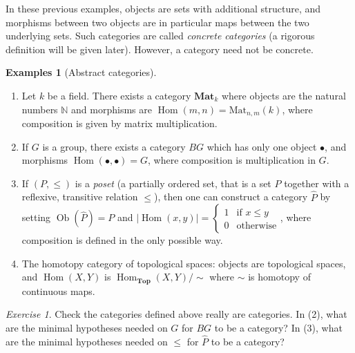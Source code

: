\documentclass{article}
\newcommand{\N}{\mathbb{N}}
\newcommand{\Top}{\mathbf{Top}}
\DeclareMathOperator{\Ob}{Ob}
\DeclareMathOperator{\Hom}{Hom}
\theoremstyle{plain}
\theoremstyle{definition}
\newtheorem{examples}[theorem]{Examples}
\theoremstyle{remark}
\newtheorem*{exercise}{Exercise}
\begin{document}
In these previous examples, objects are sets with additional structure, and morphisms between two objects are in particular maps between the two underlying sets. Such categories are called \emph{concrete categories} (a rigorous definition will be given later). However, a category need not be concrete.

\begin{examples}[Abstract categories] \leavevmode
    \begin{enumerate}
        \item Let $k$ be a field. There exists a category $\mathbf{Mat}_k$ where objects are the natural numbers $\N$ and morphisms are $\Hom(m,n) = \mathrm{Mat}_{n,m} (k)$, where composition is given by matrix multiplication.
        \item If $G$ is a group, there exists a category $BG$ which has only one object $\bullet$, and morphisms $\Hom(\bullet, \bullet) = G$, where composition is multiplication in $G$.
        \item If $(P,\le)$ is a \emph{poset} (a partially ordered set, that is a set $P$ together with a reflexive, transitive relation $\le$), then one can construct a category $\hat{P}$ by setting $\Ob(\hat{P}) = P$ and $|\Hom(x,y)| = \begin{cases}
            1 & \text{if $x\le y$} \\ 0 & \text{otherwise}
        \end{cases}$, where composition is defined in the only possible way.
        \item The homotopy category of topological spaces: objects are topological spaces, and $\Hom(X,Y)$ is $\Hom_\Top(X,Y)/\sim$ where $\sim$ is homotopy of continuous maps.
    \end{enumerate}
\end{examples}

\begin{exercise}
    Check the categories defined above really are categories. In (2), what are the minimal hypotheses needed on $G$ for $BG$ to be a category? In (3), what are the minimal hypotheses needed on $\le$ for $\hat{P}$ to be a category?
\end{exercise}
\end{document}
